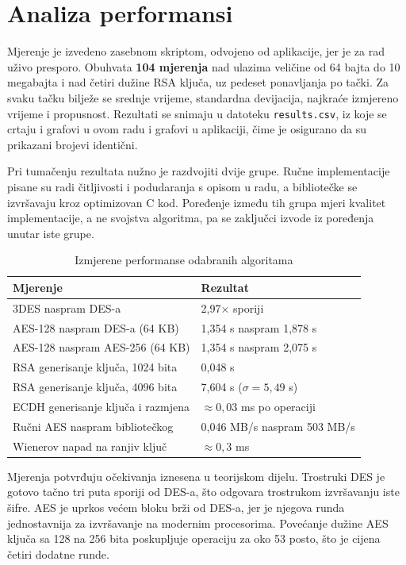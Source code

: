 \section{Analiza performansi}
\label{sec:performanse}

Mjerenje je izvedeno zasebnom skriptom, odvojeno od aplikacije, jer je za rad uživo presporo. Obuhvata \textbf{104 mjerenja} nad ulazima veličine od 64 bajta do 10 megabajta i nad četiri dužine RSA ključa, uz pedeset ponavljanja po tački. Za svaku tačku bilježe se srednje vrijeme, standardna devijacija, najkraće izmjereno vrijeme i propusnost. Rezultati se snimaju u datoteku \texttt{results.csv}, iz koje se crtaju i grafovi u ovom radu i grafovi u aplikaciji, čime je osigurano da su prikazani brojevi identični.

Pri tumačenju rezultata nužno je razdvojiti dvije grupe. Ručne implementacije pisane su radi čitljivosti i podudaranja s opisom u radu, a bibliotečke se izvršavaju kroz optimizovan C kod. Poređenje između tih grupa mjeri kvalitet implementacije, a ne svojstva algoritma, pa se zaključci izvode iz poređenja unutar iste grupe.

\begin{table}[htbp]
  \centering
  \caption{Izmjerene performanse odabranih algoritama}
  \label{tab:performanse}
  \begin{tabular}{ll}
    \toprule
    \textbf{Mjerenje} & \textbf{Rezultat} \\
    \midrule
    3DES naspram DES-a                  & 2,97$\times$ sporiji \\
    AES-128 naspram DES-a (64 KB)       & 1,354 s naspram 1,878 s \\
    AES-128 naspram AES-256 (64 KB)     & 1,354 s naspram 2,075 s \\
    RSA generisanje ključa, 1024 bita   & 0,048 s \\
    RSA generisanje ključa, 4096 bita   & 7,604 s ($\sigma = 5{,}49$ s) \\
    ECDH generisanje ključa i razmjena  & $\approx 0,03$ ms po operaciji \\
    Ručni AES naspram bibliotečkog      & 0,046 MB/s naspram 503 MB/s \\
    Wienerov napad na ranjiv ključ      & $\approx 0,3$ ms \\
    \bottomrule
  \end{tabular}
\end{table}

Mjerenja potvrđuju očekivanja iznesena u teorijskom dijelu. Trostruki DES je gotovo tačno tri puta sporiji od DES-a, što odgovara trostrukom izvršavanju iste šifre. AES je uprkos većem bloku brži od DES-a, jer je njegova runda jednostavnija za izvršavanje na modernim procesorima. Povećanje dužine AES ključa sa 128 na 256 bita poskupljuje operaciju za oko 53 posto, što je cijena četiri dodatne runde.

